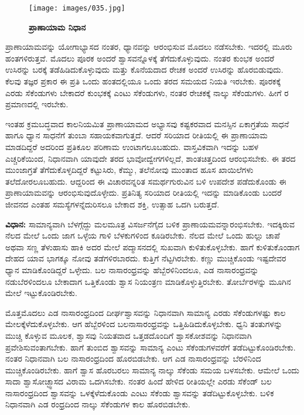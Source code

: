 \begin{center}
\end{center}


\begin{figure}
\texttt{[image: images/035.jpg]}
\caption{ \textbf{ಪ್ರಾಣಾಯಾಮ ನಿಧಾನ} }
\end{figure}

ಪ್ರಾಣಾಯಾಮವನ್ನು ಯೋಗಾಭ್ಯಾಸದ ನಂತರ, ಧ್ಯಾನವನ್ನು ಆರಂಭಿಸುವ ಮೊದಲು ನಡೆಸಬೇಕು. ಇದರಲ್ಲಿ ಮೂರು ಹಂತಗಳಿರುತ್ತವೆ. ಮೊದಲು ಪೂರಕ ಅಂದರೆ ಶ್ವಾಸವನ್ನೊಳಕ್ಕೆ ತೆಗೆದುಕೊಳ್ಳುವುದು. ನಂತರ ಕುಂಭಕ ಅಂದರೆ ಉಸಿರನ್ನು ಬರಕ್ಕೆ ತಡೆಹಿಡಿದುಕೊಳ್ಳುವುದು ಮತ್ತು ಕೊನೆಯದಾದ ರೇಚಕ ಅಂದರೆ ಉಸಿರನ್ನು ಹೊರಬಿಡುವುದು. ಕೆಲವು ತಜ್ಞರ ಪ್ರಕಾರ ಈ ಪ್ರತಿ ಒಂದು ಹಂತದಲ್ಲಿಯೂ ಒಂದು ತರದ ಸಮಯದ ನಿಯತಿ ಇರಬೇಕು. ಪೂರಕಕ್ಕೆ ಎರಡು ಸೆಕೆಂಡುಗಳು ಬೇಕಾದರೆ ಕುಂಭಕಕ್ಕೆ ಎಂಟು ಸೆಕೆಂಡುಗಳು, ನಂತರ ರೇಚಕಕ್ಕೆ ನಾಲ್ಕು ಸೆಕೆಂಡುಗಳು. ಹೀಗೆ  ರ ಪ್ರಮಾಣದಲ್ಲಿ ಇರಬೇಕು.

ಇಂತಹ ಕ್ರಮಬದ್ಧವಾದ ಕಾಲನಿಯಮಿತ ಪ್ರಾಣಾಯಾಮದ ಅಭ್ಯಾಸವು ಕಷ್ಟಕರವಾದ ಮನಸ್ಸಿನ ಏಕಾಗ್ರತೆಯ ಸಾಧನೆ ಹಾಗೂ ಧ್ಯಾನ ಸಾಧನೆಗೆ ತುಂಬಾ ಸಹಾಯಕವಾಗುತ್ತದೆ. ಆದರೆ ಸರಿಯಾದ ರೀತಿಯಲ್ಲಿ ಈ ಪ್ರಾಣಾಯಾಮ ಮಾಡದಿದ್ದರೆ ಅದರಿಂದ ಪ್ರತಿಕೂಲ ಪರಿಣಾಮ ಉಂಟಾಗಲೂಬಹುದು. ವಾಸ್ತವಿಕವಾಗಿ ಇದನ್ನು ಬಹಳ ಎಚ್ಚರಿಕೆಯಿಂದ, ನಿಧಾನವಾಗಿ ಯಾವುದೇ ತರದ ಭಾವೋದ್ವೇಗಗಳಿಲ್ಲದೆ, ಶಾಂತಚಿತ್ತದಿಂದ ಆರಂಭಿಸಬೇಕು. ಈ ತರದ ಮುಂಜಾಗ್ರತೆ ತೆಗೆದುಕೊಳ್ಳದಿದ್ದರೆ ಕಟ್ಟುಸಿರು, ಕೆಮ್ಮು, ತಲೆನೋವು ಮುಂತಾದ ಹೂಸ ಖಾಯಿಲೆಗಳು ತಲೆದೋರಲೂಬಹುದು. ಆದ್ದರಿಂದ ಈ ವಿಚಾರವನ್ನರಿತ ಸಮರ್ಥಗುರುವಿನ ಬಳಿ ಉಪದೇಶ ಪಡೆದುಕೊಂಡು ಈ ಪ್ರಾಣಾಯಾಮವನ್ನು ಆರಂಭಿಸುವುದೊಳ್ಳೇದು. ಪ್ರತಿನಿತ್ಯ ಸರಿಯಾದ ರೀತಿಯಲ್ಲಿ ಇದನ್ನು ಮಾಡಿಕೊಂಡು ಬಂದರೆ ಜೀವನದ ಎಂತಹ ಸಮಸ್ಯೆಗಳನ್ನೆದುರಿಸಲೂ ಬೇಕಾದ ಶಕ್ತಿ, ಉತ್ಸಾಹ ಒದಗಿ ಬರುತ್ತದೆ.

\textbf{ವಿಧಾನ:} ಸಾಮಾನ್ಯವಾಗಿ ಬೆಳಗ್ಗೆದ್ದು ಮಲಮೂತ್ರ ವಿಸರ್ಜನೆಗೈದ ಬಳಿಕ ಪ್ರಾಣಾಯಮವನ್ನಾರಂಭಿಸಬೇಕು. ಇದಕ್ಕಿರುವ ನೆಲದ ಮೇಲೆ ಒಂದು ಜಾಗ ಒಳ್ಳೆಯ ಗಾಳಿ ಬೆಳಕುಗಳಿಂದ ಕೂಡಿರಬೇಕು. ನೆಲದ ಮೇಲೆ ಒಂದು ಹುಲ್ಲು ಚಾಪೆ ಅಥವಾ ಸಣ್ಣ ತೆಳುಹಾಸು ಹಾಕಿ ಅದರ ಮೇಲೆ ಪದ್ಮಾಸನದಲ್ಲಿ ಸುಖವಾಗಿ ಕುಳಿತುಕೊಳ್ಳಬೇಕು. ಹಾಗೆ ಕುಳಿತುಕೊಂಡಾಗ ದೇಹದ ಯಾವ ಭಾಗಕ್ಕೂ ನೋವು ತಡೆಗಳಿರಬಾರದು. ಕುತ್ತಿಗೆ ನೆಟ್ಟಗಿರಬೇಕು. ಕಣ್ಣು ಮುಚ್ಚಿಕೊಂಡು ಇಷ್ಟದೇವರ ಧ್ಯಾನ ಮಾಡಿಕೊಂಡಿದ್ದರೆ ಒಳ್ಳೇದು. ಬಲ ನಾಸಾರಂಧ್ರವನ್ನು ಹೆಬ್ಬೆರಳಿನಿಂದಲೂ, ಎಡ ನಾಸಾರಂಧ್ರವನ್ನು ನಡುಬೆರಳಿಂದಲೂ ಬೇಕಾದಾಗ ಒತ್ತಿಕೊಂಡು ಶ್ವಾಸ ನಿಯಂತ್ರಣ ಮಾಡಿಕೊಳ್ಳುತ್ತಿರಬೇಕು. ತೋರ್ಬೆರಳನ್ನು ಮೂಗಿನ ಮೇಲೆ ಇಟ್ಟುಕೊಂಡಿರಬೇಕು.

ಮೊತ್ತಮೊದಲು ಎಡ ನಾಸಾರಂಧ್ರದಿಂದ ದೀರ್ಘಶ್ವಾಸವನ್ನು ನಿಧಾನವಾಗಿ ಸಾಮಾನ್ಯ ಎರಡು ಸೆಕೆಂಡುಗಳಷ್ಟು ಕಾಲ ಮೇಲಕ್ಕೆಳೆದುಕೊಳ್ಳಬೇಕು. ಆಗ ಹೆಬ್ಬೆರಳಿಂದ ಬಲನಾಸಾರಂಧ್ರವನ್ನು ಒತ್ತಿಹಿಡಿದುಕೊಳ್ಳಬೇಕು. ಧ್ವನಿ ತಂತುಗಳನ್ನು ಮುಚ್ಚಿ ಕೊಳ್ಳುವ ಮೂಲಕ, ಶ್ವಾಸವು ನಿಯತವಾದ ಒತ್ತಡದೊಂದಿಗೆ ಶ್ವಾಸಕೋಶವನ್ನು ನಿಧಾನವಾಗಿ ಪ್ರವೇಶಿಸುವಂತಾಗಬೇಕು. ಹಾಗೆ ತುಂಬಿದ ಶ್ವಾಸವನ್ನು ಸಾಮಾನ್ಯ ಎಂಟು ಸೆಕೆಂಡುಗಳವರೆಗೆ ತಡೆದಿಟ್ಟುಕೊಂಡಿರಬೇಕು. ನಂತರ ನಿಧಾನವಾಗಿ ಬಲ ನಾಸಾರಂಧ್ರದಿಂದ ಹೊರಬಿಡಬೇಕು. ಆಗ ಎಡ ನಾಸಾರಂಧ್ರವನ್ನು ಬೆರಳಿನಿಂದ ಮುಚ್ಚಿಕೊಂಡಿರಬೇಕು. ಹಾಗೆ ಶ್ವಾಸ ಹೊರಬರಲು ಸಾಮಾನ್ಯ ನಾಲ್ಕು ಸೆಕೆಂಡು ಸಮಯ ಬಳಸಬೇಕು. ಆಮೇಲೆ ಒಂದು ಸಾದಾ ಶ್ವಾಸೋಚ್ಛ್ವಾಸದ ವಿರಾಮ ಒದಗಿಸಬೇಕು. ನಂತರ ಹಿಂದೆ ಹೇಳಿದ ರೀತಿಯಲ್ಲೇ ಎರಡು ಸೆಕೆಂಡ್ ಬಲ ನಾಸಾರಂಧ್ರದಿಂದ ಶ್ವಾಸವನ್ನು ಒಳಕ್ಕೆಳೆದುಕೊಂಡು ಎಂಟು ಸೆಕೆಂಡು ಶ್ವಾಸವನ್ನು ತಡೆದಿಟ್ಟುಕೊಳ್ಳಬೇಕು. ಬಳಿಕ ನಿಧಾನವಾಗಿ ಎಡ ರಂಧ್ರದಿಂದ ನಾಲ್ಕು ಸೆಕೆಂಡುಗಳ ಕಾಲ ಹೊರಬಿಡಬೇಕು.

